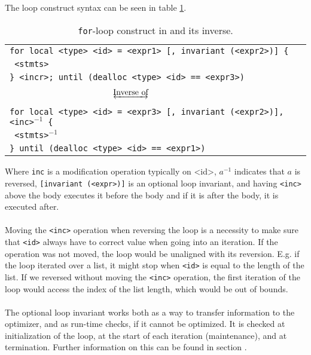 The loop construct syntax can be seen in table \ref{table:for-loop-inverse}.
\begin{table}[!h]
    \centering
    \begin{tabular}{l}
        \texttt{for local <type> <id> = <expr1> [, invariant (<expr2>)] \{} \\
        \texttt{ <stmts>} \\
        \texttt{\} <incr>; until (dealloc <type> <id> == <expr3>)} \\ \\
        $~~~~~~~~~~~~~~~~~~~~~~~~~~~~~~~~~~~~~\underleftrightarrow{\text{Inverse of}}$ \\ \\
        \texttt{for local <type> <id> = <expr3> [, invariant (<expr2>)], <inc>$^{-1}$ \{ }\\
        \texttt{ <stmts>$^{-1}$} \\
        \texttt{\} until (dealloc <type> <id> == <expr1>)} 
    \end{tabular}
    \caption{\texttt{for}-loop construct in \lan and its inverse.}
    \label{table:for-loop-inverse}
\end{table}
\noindent
Where \texttt{inc} is a modification operation typically on <id>, $a^{-1}$ indicates that
$a$ is reversed, \texttt{[invariant (<expr>)]} is an optional loop invariant, and having
\texttt{<inc>} above the body executes it before the body and if it is after the body, it
is executed after.
\\
\\
Moving the \texttt{<inc>} operation when reversing the loop is a necessity to make sure that
\texttt{<id>} always have to correct value when going into an iteration. If the operation was not
moved, the loop would be unaligned with its reversion. E.g. if the loop iterated over a list,
it might stop when \texttt{<id>} is equal to the length of the list. If we reversed without moving
the \texttt{<inc>} operation, the first iteration of the loop would access the index of the list
length, which would be out of bounds.
\\
\\
The optional loop invariant works both as a way to transfer information to the optimizer, and
as run-time checks, if it cannot be optimized. It is checked at initialization of the loop, at the
start of each iteration (maintenance), and at termination. Further information on this can be found
in section .

